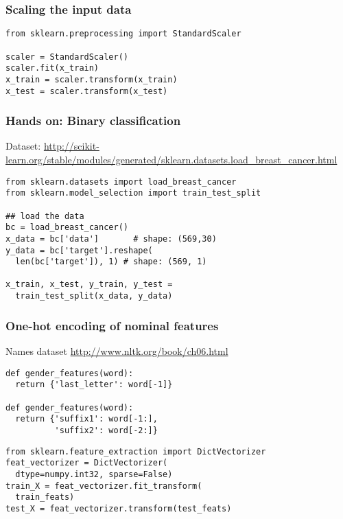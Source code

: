 \documentclass{beamer}
\begin{document}
\begin{frame}[fragile]
\frametitle{Scaling the input data}

\begin{lstlisting}
from sklearn.preprocessing import StandardScaler

scaler = StandardScaler()
scaler.fit(x_train)
x_train = scaler.transform(x_train)
x_test = scaler.transform(x_test)
\end{lstlisting}
\end{frame}

\begin{frame}[fragile]
\frametitle{Hands on: Binary classification}

Dataset: \url{http://scikit-learn.org/stable/modules/generated/sklearn.datasets.load_breast_cancer.html}

\begin{footnotesize}
\begin{lstlisting}
from sklearn.datasets import load_breast_cancer
from sklearn.model_selection import train_test_split

## load the data
bc = load_breast_cancer()
x_data = bc['data']       # shape: (569,30)
y_data = bc['target'].reshape(
  len(bc['target']), 1) # shape: (569, 1)

x_train, x_test, y_train, y_test =
  train_test_split(x_data, y_data)

\end{lstlisting}
\end{footnotesize}
\end{frame}

\begin{frame}[fragile]
\frametitle{One-hot encoding of nominal features}
Names dataset
\url{http://www.nltk.org/book/ch06.html}

\begin{footnotesize}
\begin{lstlisting}
def gender_features(word):
  return {'last_letter': word[-1]}

def gender_features(word):
  return {'suffix1': word[-1:],
          'suffix2': word[-2:]}
\end{lstlisting}
\end{footnotesize}
\pause
\vspace{-1.5ex}

\begin{footnotesize}
\begin{lstlisting}
from sklearn.feature_extraction import DictVectorizer
feat_vectorizer = DictVectorizer(
  dtype=numpy.int32, sparse=False)
train_X = feat_vectorizer.fit_transform(
  train_feats)
test_X = feat_vectorizer.transform(test_feats)
\end{lstlisting}
\end{footnotesize}
\end{frame}
\end{document}
